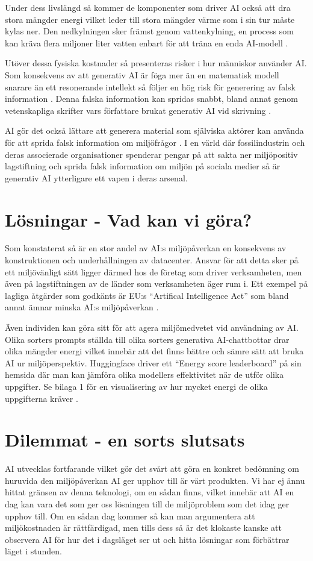 \documentclass[conference]{IEEEtran}
\begin{document}
Under dess livslängd så kommer de komponenter som driver AI också att dra stora mängder energi vilket leder till stora mängder värme som i sin tur måste kylas ner. Den nedkylningen sker främst genom vattenkylning, en process som kan kräva flera miljoner liter vatten enbart för att träna en enda AI-modell \cite{b10}. 

Utöver dessa fysiska kostnader så presenteras risker i hur människor använder AI. Som konsekvens av att generativ AI är föga mer än en matematisk modell snarare än ett resonerande intellekt så följer en hög risk för generering av falsk information \cite{b11}. Denna falska information kan spridas snabbt, bland annat genom vetenskapliga skrifter vars författare brukat generativ AI vid skrivning \cite{b12}.  

AI gör det också lättare att generera material som själviska aktörer kan använda för att sprida falsk information om miljöfrågor \cite{b13}. I en värld där fossilindustrin och deras associerade organisationer spenderar pengar på att sakta ner miljöpositiv lagstiftning \cite{b14} och sprida falsk information om miljön på sociala medier \cite{b15} så är generativ AI ytterligare ett vapen i deras arsenal. 

\section{Lösningar - Vad kan vi göra?}

Som konstaterat så är en stor andel av AI:s miljöpåverkan en konsekvens av konstruktionen och underhållningen av datacenter. Ansvar för att detta sker på ett miljövänligt sätt ligger därmed hos de företag som driver verksamheten, men även på lagstiftningen av de länder som verksamheten äger rum i. Ett exempel på lagliga åtgärder som godkänts är EU:s “Artifical Intelligence Act” som bland annat ämnar minska AI:s miljöpåverkan \cite{b16}.  

Även individen kan göra sitt för att agera miljömedvetet vid användning av AI. Olika sorters prompts ställda till olika sorters generativa AI-chattbottar drar olika mängder energi \cite{b17} vilket innebär att det finns bättre och sämre sätt att bruka AI ur miljöperspektiv. Huggingface driver ett “Energy score leaderboard” på sin hemsida \cite{b18} där man kan jämföra olika modellers effektivitet när de utför olika uppgifter. Se bilaga 1 för en visualisering av hur mycket energi de olika uppgifterna kräver \cite{b19}. 

\section{Dilemmat - en sorts slutsats}
AI utvecklas fortfarande vilket gör det svårt att göra en konkret bedömning om huruvida den miljöpåverkan AI ger upphov till är värt produkten. Vi har ej ännu hittat gränsen av denna teknologi, om en sådan finns, vilket innebär att AI en dag kan vara det som ger oss lösningen till de miljöproblem som det idag ger upphov till. Om en sådan dag kommer så kan man argumentera att miljökostnaden är rättfärdigad, men tills dess så är det klokaste kanske att observera AI för hur det i dagsläget ser ut och hitta lösningar som förbättrar läget i stunden. 
\end{document}
